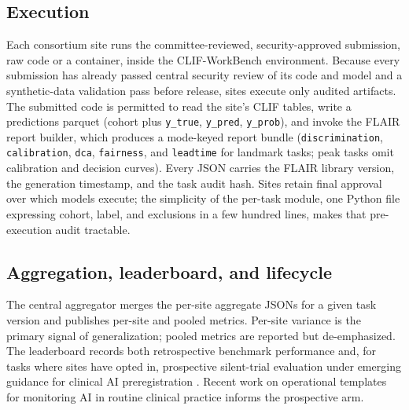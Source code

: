 \subsection*{Execution}

Each consortium site runs the committee-reviewed, security-approved
submission, raw code or a container, inside the CLIF-WorkBench
environment. Because every submission has already passed central security
review of its code and model and a synthetic-data validation pass before
release, sites execute only audited artifacts. The submitted code is
permitted to read the site's CLIF tables, write a predictions parquet (cohort plus
\texttt{y\_true}, \texttt{y\_pred}, \texttt{y\_prob}), and invoke the
FLAIR report builder, which produces a mode-keyed report bundle
(\texttt{discrimination}, \texttt{calibration}, \texttt{dca},
\texttt{fairness}, and \texttt{leadtime} for landmark tasks; peak tasks
omit calibration and decision curves). Every JSON carries the FLAIR
library version, the generation timestamp, and the task audit hash. Sites retain final approval over which models
execute; the simplicity of the per-task module, one Python file
expressing cohort, label, and exclusions in a few hundred lines, 
makes that pre-execution audit tractable.

\subsection*{Aggregation, leaderboard, and lifecycle}

The central aggregator merges the per-site aggregate JSONs for a given
task version and publishes per-site and pooled metrics. Per-site variance is the primary signal of
generalization; pooled metrics are reported but de-emphasized. The
leaderboard records both retrospective benchmark performance and, for
tasks where sites have opted in, prospective silent-trial evaluation
under emerging guidance for clinical AI preregistration
\citep{goodman2025preregistration,joshi2025silenttrials}. Recent work
on operational templates for monitoring AI in routine clinical practice
\citep{pragmaticplaybook2024} informs the prospective arm.

